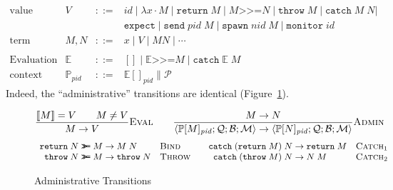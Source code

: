 \documentclass{article}
\newcommand{\sLam}[2]{\lambda {#1} \cdot {#2}}
\newcommand{\sApp}[2]{{#1} {#2}}
\newcommand{\sBind}[2]{{#1} \mathrel{\texttt{>}\!\!\texttt{>}\!\texttt{=}} {#2}}
\newcommand{\sReturn}{\mathtt{return}}
\newcommand{\sThrow}[1]{\mathtt{throw} \; {#1}}
\newcommand{\sCatch}[2]{\mathtt{catch} \; {#1} \; {#2}}
\newcommand{\sExpect}{\mathtt{expect}}
\newcommand{\sSend}{\mathtt{send}}
\newcommand{\sSpawn}{\mathtt{spawn}}
\newcommand{\sMonitor}{\mathtt{monitor}}
\newcommand{\sPar}{\mathrel{\parallel}}
\newcommand{\sNid}{\ensuremath{\mathit{nid}}}
\newcommand{\sPid}{\ensuremath{\mathit{pid}}}
\newcommand{\sId}{\ensuremath{\mathit{id}}}
\newcommand{\sSystem}[4]{\left\langle #1 ; #2 ; #3 ; #4 \right\rangle}
\newcommand{\sQueue}{\mathcal{Q}}
\newcommand{\sProcesses}{\mathcal{P}}
\newcommand{\sBlacklist}{\mathcal{B}}
\newcommand{\sMonitors}{\mathcal{M}}
\newcommand{\sCtxt}[1]{\mathbb{#1}}
\newcommand{\OR}{\mathrel{|}}
\begin{document}
\begin{equation*}
\begin{array}{llll}
\text{value} & V & ::= & \sId \OR
                         \sLam{x}{M} \OR 
                         \sReturn \; M \OR
                         \sBind{M}{N} \OR 
                         \sThrow{M} \OR \sCatch{M}{N} \OR \\
                     &&& \sExpect \OR
                         \sSend \; \sPid \; M \OR
                         \sSpawn \; \sNid \; M \OR 
                         \sMonitor \; \sId 
\\
\text{term}  & M, N & ::= & x \OR
                            V \OR
                            \sApp{M}{N} \OR
                            \cdots \\
\\                            
\text{Evaluation} & \sCtxt{E} & ::= & [] \OR \sBind{\sCtxt{E}}{M} \OR \sCatch{\sCtxt{E}}{M} \\
\text{context} & \sCtxt{P}_\sPid  & ::= & \sCtxt{E}[]_\sPid \sPar \sProcesses
\end{array}
\end{equation*}
%
Indeed, the ``administrative'' transitions are identical
(Figure~\ref{fig:administrative}).

\begin{figure}
\small
\begin{equation*}
\frac{
  \llbracket M \rrbracket = V \qquad
  M \neq V
}{
  M \rightarrow V
} \textsc{Eval}
\qquad
\frac{
  M \rightarrow N
}{
  \sSystem{\sCtxt{P}[M]_\sPid}
          {\sQueue}
          {\sBlacklist}
          {\sMonitors}
\rightarrow
  \sSystem{\sCtxt{P}[N]_\sPid}
          {\sQueue}
          {\sBlacklist}
          {\sMonitors}
} \textsc{Admin}
\end{equation*}
%
\begin{equation*}
\begin{array}{r@{\;\rightarrow\;}ll@{\hspace{2em}}r@{\;\rightarrow\;}ll}
\sBind{\sReturn \; N}{M} & M \; N & \textsc{Bind} & \sCatch{(\sReturn \; M)}{N} & \sReturn \; M & \textsc{Catch}_1 \\
\sBind{\sThrow{N}}{M} & \sThrow{N} & \textsc{Throw} & \sCatch{(\sThrow M)}{N} & N \; M & \textsc{Catch}_2 \\
\end{array}
\end{equation*}
%
\caption{\label{fig:administrative}Administrative Transitions}
\end{figure}
\end{document}
